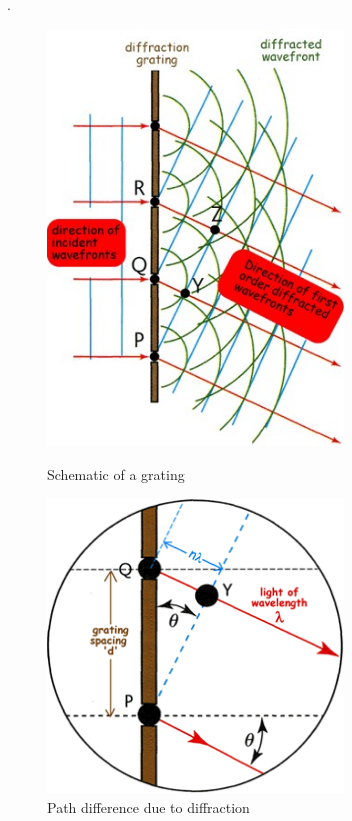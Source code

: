 .	\begin{figure}[htbp]
		\begin{minipage}[c]{0.5\linewidth}
			\centering
			\includegraphics[width=0.7\textwidth]{../Images/grating_to_split_light.jpg}
			\caption{\label{fig:grating_to_split_light} Schematic of a grating}
		\end{minipage}
		\begin{minipage}[c]{0.5\linewidth}
			\centering
			\includegraphics[width=0.7\textwidth]{../Images/grating_close_up.png}
			\caption{\label{fig:grating_close_up} Path difference due to diffraction}
		\end{minipage}
	\end{figure}

